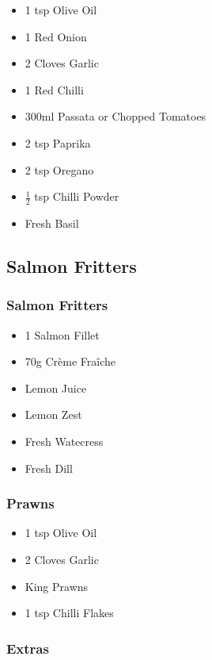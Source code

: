 \documentclass[11pt, english]{article}
\begin{document}
	\begin{itemize}
        \setlength\itemsep{0cm}
                \item 1 tsp Olive Oil
		\item 1 Red Onion
		\item 2 Cloves Garlic
		\item 1 Red Chilli
		\item 300ml Passata or Chopped Tomatoes
		\item 2 tsp Paprika
		\item 2 tsp Oregano
		\item $\frac{1}{2}$ tsp Chilli Powder
		\item Fresh Basil
        \end{itemize}

\newpage

	\subsection{Salmon Fritters}

		\subsubsection*{Salmon Fritters}

	\begin{itemize}
        \setlength\itemsep{0cm}
                \item 1 Salmon Fillet
		\item 70g Cr\`{e}me Fra\^{i}che
		\item Lemon Juice
		\item Lemon Zest
		\item Fresh Watecress
		\item Fresh Dill
        \end{itemize}

		\subsubsection*{Prawns}

	\begin{itemize}
        \setlength\itemsep{0cm}
                \item 1 tsp Olive Oil
		\item 2 Cloves Garlic
		\item King Prawns
		\item 1 tsp Chilli Flakes
        \end{itemize}

		\subsubsection*{Extras}
\end{document}
